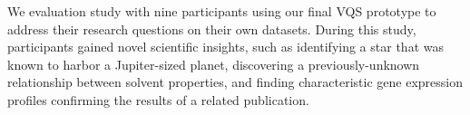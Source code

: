  \par We  evaluation study with nine participants using our final VQS prototype to address their research questions on their own datasets. During this study, participants gained novel scientific insights,
 such as identifying a star that was known to harbor a Jupiter-sized planet, discovering a previously-unknown relationship between solvent properties, and finding characteristic gene expression profiles confirming the results of a related publication. %
